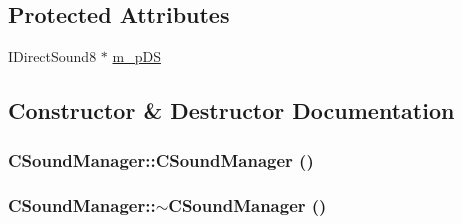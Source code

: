 \subsection*{Protected Attributes}
\begin{DoxyCompactItemize}
\item 
IDirectSound8 $\ast$ \hyperlink{class_c_sound_manager_a453dcab3ba8fc5f622da84e609cb3363}{m\_\-pDS}
\end{DoxyCompactItemize}


\subsection{Constructor \& Destructor Documentation}
\hypertarget{class_c_sound_manager_ae8358c75282bcceb23bd23ea9328e407}{
\subsubsection[{CSoundManager}]{\setlength{\rightskip}{0pt plus 5cm}CSoundManager::CSoundManager ()}}
\label{class_c_sound_manager_ae8358c75282bcceb23bd23ea9328e407}
\hypertarget{class_c_sound_manager_a75bc0ad3cc339baeb29372632c02f5f2}{
\subsubsection[{$\sim$CSoundManager}]{\setlength{\rightskip}{0pt plus 5cm}CSoundManager::$\sim$CSoundManager ()}}
\label{class_c_sound_manager_a75bc0ad3cc339baeb29372632c02f5f2}


